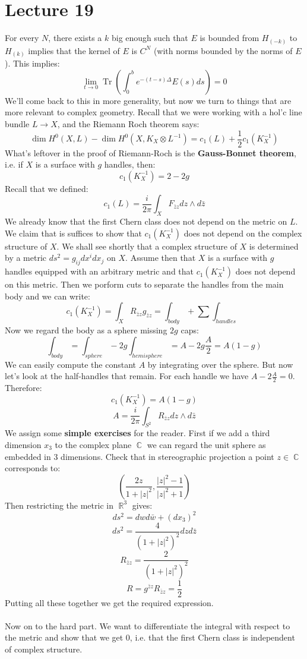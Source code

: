 \documentclass[12 pt]{article}
\DeclareMathOperator {\R} {\mathbb{R}}
\DeclareMathOperator {\C} {\mathbb{C}}
\DeclareMathOperator {\Tr}{Tr}
\theoremstyle{plain}
\theoremstyle{definition}
\theoremstyle{remark}
\begin{document}
\section*{Lecture 19}
For every $N$, there exists a $k$ big enough such that $E$ is bounded from $H_{(-k)}$ to $H_{(k)}$ implies that the kernel of $E$ is $C^N$ (with norms bounded by the norms of $E$). This implies:
\[       \lim_{t\to 0} \Tr\left( \int_0^b e^{-(t-s) \Delta} E(s) ds \right) = 0    \]
We'll come back to this in more generality, but now we turn to things that are more relevant to complex geometry. Recall that we were working with a hol'c line bundle $L \to X$, and the Riemann Roch theorem says:
\[     \dim H^0(X,L) - \dim H^0(X, K_X \otimes L^{-1})   = c_1(L) + \frac{1}{2} c_1(K_X^{-1})       \]
What's leftover in the proof of Riemann-Roch is the \textbf{Gauss-Bonnet theorem}, i.e. if $X$ is a surface with $g$ handles, then:
\[         c_1(K_X^{-1}) = 2 - 2g      \]
Recall that we defined:
\[      c_1 (L) = \frac{i}{2\pi} \int_X F_{\bar z z} dz \wedge d \bar z     \]
We already know that the first Chern class does not depend on the metric on $L$. We claim that is suffices to show that $c_1(K_X^{-1})$ does not depend on the complex structure of $X$. We shall see shortly that a complex structure of $X$ is determined by a metric $ds^2 = g_{ij} dx^i dx_j$ on $X$. Assume then that $X$ is a surface with $g$ handles equipped with an arbitrary metric and that $c_1(K_X^{-1})$ does not depend on this metric. Then we porform cuts to separate the handles from the main body and we can write:
\[       c_1(K_X^{-1})  = \int_X R_{\bar z z} g_{\bar z z} = \int_{body} + \sum \int_{handles}  \]
Now we regard the body as a sphere missing $2g$ caps:
\[    \int_{body} = \int_{sphere} - 2g \int_{hemisphere}  = A - 2g \frac{A}{2} = A(1-g)  \]
We can easily compute the constant $A$ by integrating over the sphere. But now let's look at the half-handles that remain. For each handle we have $A - 2 \frac{A}{2} = 0$. Therefore:
\[         c_1(K_X^{-1})  = A(1-g)      \]
\[           A = \frac{i}{2\pi} \int_{S^2} R_{\bar z z} dz \wedge d \bar z        \]
We assign some \textbf{simple exercises} for the reader. First if we add a third dimension $x_3$ to the complex plane $\C$ we can regard the unit sphere as embedded in 3 dimensions. Check that in stereographic projection a point $z \in \C$ corresponds to:
\[       \left( \frac{2z}{1+ |z|^2}  , \frac{|z|^2 - 1}{|z|^2+1} \right)     \]
Then restricting the metric in $\R^3$ gives:
\[       ds^2 = dw d\bar w + (dx_3)^2      \]
\[        ds^2 = \frac{4}{(1+|z|^2)^2} dz d\bar z      \]
\[      R_{\bar z z} =  \frac{2}{(1+|z|^2)^2}      \]
\[    R = g^{\bar z z} R_{\bar zz}  = \frac{1}{2}    \]
Putting all these together we get the required expression.
\\
\\
Now on to the hard part. We want to differentiate the integral with respect to the metric and show that we get 0, i.e. that the first Chern class is independent of complex structure.
\end{document}
